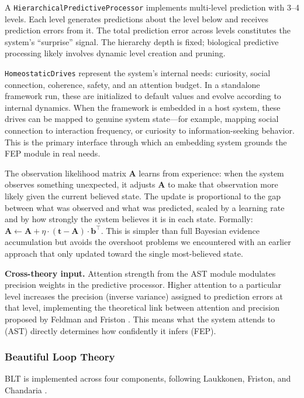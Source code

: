 A \texttt{HierarchicalPredictiveProcessor} implements multi-level prediction with 3--4 levels. Each level generates predictions about the level below and receives prediction errors from it. The total prediction error across levels constitutes the system's ``surprise'' signal. The hierarchy depth is fixed; biological predictive processing likely involves dynamic level creation and pruning.

\texttt{HomeostaticDrives} represent the system's internal needs: curiosity, social connection, coherence, safety, and an attention budget. In a standalone framework run, these are initialized to default values and evolve according to internal dynamics. When the framework is embedded in a host system, these drives can be mapped to genuine system state---for example, mapping social connection to interaction frequency, or curiosity to information-seeking behavior. This is the primary interface through which an embedding system grounds the FEP module in real needs.

The observation likelihood matrix $\mathbf{A}$ learns from experience: when the system observes something unexpected, it adjusts $\mathbf{A}$ to make that observation more likely given the current believed state. The update is proportional to the gap between what was observed and what was predicted, scaled by a learning rate and by how strongly the system believes it is in each state. Formally: $\mathbf{A} \leftarrow \mathbf{A} + \eta \cdot (\mathbf{t} - \mathbf{A}) \cdot \mathbf{b}^\top$. This is simpler than full Bayesian evidence accumulation but avoids the overshoot problems we encountered with an earlier approach that only updated toward the single most-believed state.

\textbf{Cross-theory input.} Attention strength from the AST module modulates precision weights in the predictive processor. Higher attention to a particular level increases the precision (inverse variance) assigned to prediction errors at that level, implementing the theoretical link between attention and precision proposed by Feldman and Friston \cite{feldman2010}. This means what the system attends to (AST) directly determines how confidently it infers (FEP).

\subsubsection{Beautiful Loop Theory}

BLT is implemented across four components, following Laukkonen, Friston, and Chandaria \cite{laukkonen2025}.

